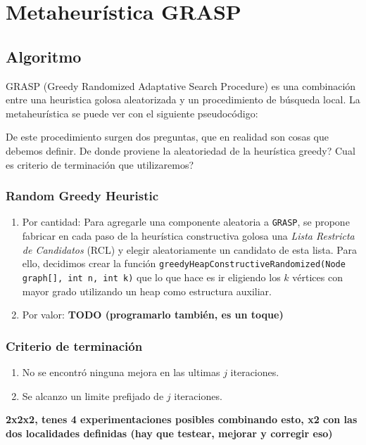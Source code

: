 \section{Metaheurística GRASP}

\subsection{Algoritmo}

GRASP (Greedy Randomized Adaptative Search Procedure) es una combinación entre una heuristica golosa aleatorizada y un procedimiento de búsqueda local. La metaheurística se puede ver con el siguiente pseudocódigo:

\begin{algorithmic}
	\EndIf
\EndWhile
\EndProcedure
\end{algorithmic}

De este procedimiento surgen dos preguntas, que en realidad son cosas que debemos definir. De donde proviene la aleatoriedad de la heurística greedy? Cual es criterio de terminación que utilizaremos?

\subsubsection{Random Greedy Heuristic}

\begin{enumerate}
\item Por cantidad:
Para agregarle una componente aleatoria a \texttt{GRASP}, se propone fabricar en cada paso de la heurística constructiva golosa una \textit{Lista Restricta de Candidatos} (RCL) y elegir aleatoriamente un candidato de esta lista. Para ello, decidimos crear la función \texttt{greedyHeapConstructiveRandomized(Node graph[], int n, int k)} que lo que hace es ir eligiendo los $k$ vértices con mayor grado utilizando un heap como estructura auxiliar.
\item Por valor: \textbf{TODO (programarlo también, es un toque)}
\end{enumerate}

\subsubsection{Criterio de terminación}
\begin{enumerate}
\item No se encontró ninguna mejora en las ultimas $j$ iteraciones.
\item Se alcanzo un limite prefijado de  $j$ iteraciones.
\end{enumerate}

\textbf{2x2x2, tenes 4 experimentaciones posibles combinando esto, x2 con las dos localidades definidas (hay que testear, mejorar y corregir eso)}